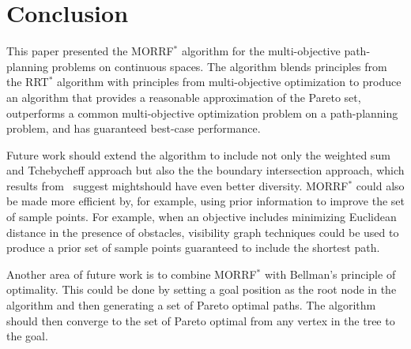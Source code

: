\documentclass{article}
\begin{document}
\section{Conclusion} 
\label{sec:conclusion}

This paper presented the MORRF$^{*}$ algorithm for the multi-objective path-planning problems on continuous spaces.
The algorithm blends principles from the RRT$^{*}$ algorithm with principles from multi-objective optimization to produce an algorithm that provides a reasonable approximation of the Pareto set, outperforms a common multi-objective optimization problem on a path-planning problem, and has guaranteed best-case performance.

Future work should extend the algorithm to include not only the weighted sum and Tchebycheff approach but also the the boundary intersection approach, which results from~\cite{4358754} suggest mightshould have even better diversity.
MORRF$^{*}$ could also be made more efficient by, for example, using prior information to improve the set of sample points.
For example, when an objective includes minimizing Euclidean distance in the presence of obstacles, visibility graph techniques could be used to produce a prior set of sample points guaranteed to include the shortest path.

Another area of future work is to combine MORRF$^{*}$ with Bellman's principle of optimality.
This could be done by setting a goal position as the root node in the algorithm and then generating a set of Pareto optimal paths.
The algorithm should then converge to the set of Pareto optimal from any vertex in the tree to the goal.





\end{document}

